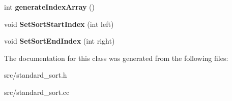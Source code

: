 \begin{DoxyCompactItemize}
\item 
\hypertarget{classstandard__sort_af04627915438ee94f478b191fad170c3}{
int {\bfseries generateIndexArray} ()}
\label{d4/dec/classstandard__sort_af04627915438ee94f478b191fad170c3}

\item 
\hypertarget{classstandard__sort_adad870016b4f87670dfb333f9923126c}{
void {\bfseries SetSortStartIndex} (int left)}
\label{d4/dec/classstandard__sort_adad870016b4f87670dfb333f9923126c}

\item 
\hypertarget{classstandard__sort_af52b283cc00932d6040282126c90f497}{
void {\bfseries SetSortEndIndex} (int right)}
\label{d4/dec/classstandard__sort_af52b283cc00932d6040282126c90f497}

\end{DoxyCompactItemize}


The documentation for this class was generated from the following files:\begin{DoxyCompactItemize}
\item 
src/standard\_\-sort.h\item 
src/standard\_\-sort.cc\end{DoxyCompactItemize}
